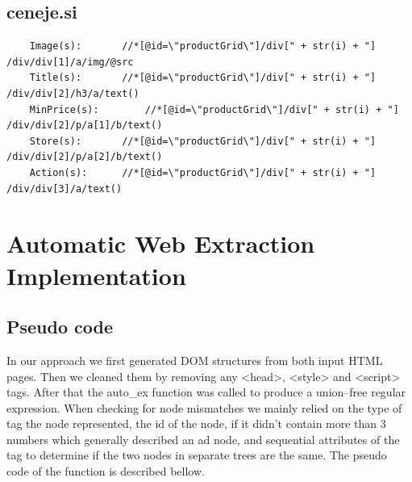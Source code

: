 \documentclass[9pt]{IEEEtran}
\begin{document}
\subsection{ceneje.si}
\begin{verbatim}
	Image(s):		//*[@id=\"productGrid\"]/div[" + str(i) + "]
/div/div[1]/a/img/@src
	Title(s):		//*[@id=\"productGrid\"]/div[" + str(i) + "]
/div/div[2]/h3/a/text()
	MinPrice(s):		//*[@id=\"productGrid\"]/div[" + str(i) + "]
/div/div[2]/p/a[1]/b/text()
	Store(s):		//*[@id=\"productGrid\"]/div[" + str(i) + "]
/div/div[2]/p/a[2]/b/text()
	Action(s):		//*[@id=\"productGrid\"]/div[" + str(i) + "]
/div/div[3]/a/text()
\end{verbatim}


\section{Automatic Web Extraction Implementation}

\subsection{Pseudo code}

In our approach we first generated DOM structures from both input HTML pages.
Then we cleaned them by removing any <head>, <style> and <script> tags.
After that the auto\_ex function was called to produce a union--free regular expression.
When checking for node mismatches we mainly relied on the type of tag the node represented, the id of the node, if it didn't contain more than 3 numbers which generally described an ad node, and sequential attributes of the tag to determine if the two nodes in separate trees are the same.
The pseudo code of the function is described bellow. 
\end{document}
